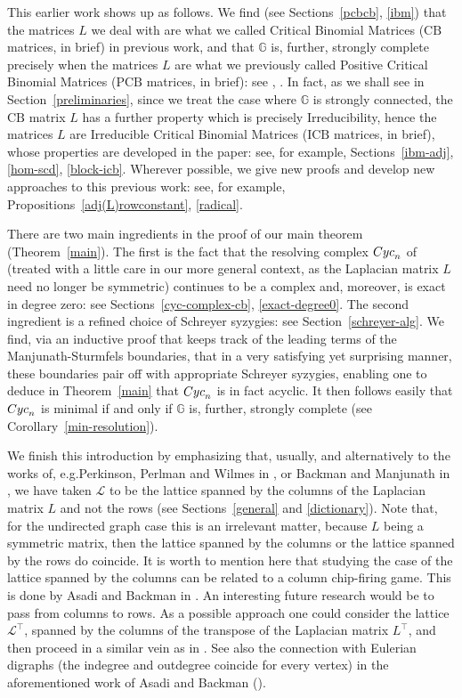 \documentclass[10pt]{amsart}
\newcommand{\eg}{e.g.}
\newcommand{\mbg}{\mbox{$\mathbb{G}$}}
\newcommand{\mcl}{\mbox{$\mathcal{L}$}}
\newcommand{\icb}{\mbox{$\mathrm{ICB}$}}
\newcommand{\pcb}{\mbox{$\mathrm{PCB}$}}
\newcommand{\cb}{\mbox{$\mathrm{CB}$}}
\newcommand{\cyc}{\mbox{${\rm Cyc}$}}
\theoremstyle{definition}
\theoremstyle{remark}
\begin{document}
This earlier work shows up as follows. We find (see
Sections~\ref{pcbcb}, \ref{ibm}) that the matrices $L$ we deal with
are what we called Critical Binomial Matrices ($\cb$ matrices, in
brief) in previous work, and that $\mbg$ is, further, strongly
complete precisely when the matrices $L$ are what we previously called
Positive Critical Binomial Matrices ($\pcb$ matrices, in brief): see
\cite{op}, \cite{opv}. In fact, as we shall see in
Section~\ref{preliminaries}, since we treat the case where $\mbg$ is
strongly connected, the $\cb$ matrix $L$ has a further property which
is precisely Irreducibility, hence the matrices $L$ are Irreducible
Critical Binomial Matrices ($\icb$ matrices, in brief), whose
properties are developed in the paper: see, for example,
Sections~\ref{ibm-adj}, \ref{hom-scd}, \ref{block-icb}. Wherever
possible, we give new proofs and develop new approaches to this
previous work: see, for example, Propositions~\ref{adj(L)rowconstant},
\ref{radical}.

There are two main ingredients in the proof of our main theorem
(Theorem~\ref{main}). The first is the fact that the resolving complex
$\cyc_n$ of \cite{ms} (treated with a little care in our more general
context, as the Laplacian matrix $L$ need no longer be symmetric)
continues to be a complex and, moreover, is exact in degree zero: see
Sections~\ref{cyc-complex-cb}, \ref{exact-degree0}.  The second
ingredient is a refined choice of Schreyer syzygies: see
Section~\ref{schreyer-alg}. We find, via an inductive proof that keeps
track of the leading terms of the Manjunath-Sturmfels boundaries, that
in a very satisfying yet surprising manner, these boundaries pair off
with appropriate Schreyer syzygies, enabling one to deduce in
Theorem~\ref{main} that $\cyc_n$ is in fact acyclic.  It then follows
easily that $\cyc_n$ is minimal if and only if $\mbg$ is, further,
strongly complete (see Corollary~\ref{min-resolution}).

We finish this introduction by emphasizing that, usually, and
alternatively to the works of, \eg Perkinson, Perlman and Wilmes in
\cite{ppw}, or Backman and Manjunath in \cite{bm}, we have taken
$\mcl$ to be the lattice spanned by the columns of the Laplacian
matrix $L$ and not the rows (see Sections~\ref{general} and
\ref{dictionary}). Note that, for the undirected graph case this is an
irrelevant matter, because $L$ being a symmetric matrix, then the
lattice spanned by the columns or the lattice spanned by the rows do
coincide. It is worth to mention here that studying the case of the
lattice spanned by the columns can be related to a column chip-firing
game. This is done by Asadi and Backman in \cite[Introduction and
  Section~3.2]{ab}. An interesting future research would be to pass
from columns to rows. As a possible approach one could consider the
lattice $\mcl^{\top}$, spanned by the columns of the transpose of the
Laplacian matrix $L^{\top}$, and then proceed in a similar vein as in
\cite{opv}. See also the connection with Eulerian digraphs (the
indegree and outdegree coincide for every vertex) in the
aforementioned work of Asadi and Backman (\cite[Theorem~3.18]{ab}).
\end{document}
